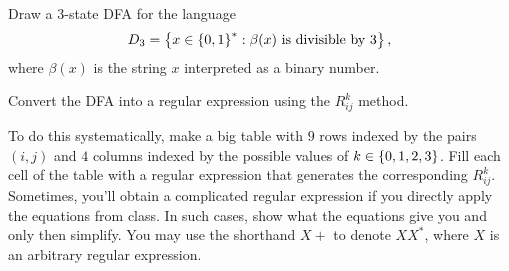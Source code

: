 \begin{problem}
  \begin{enumalph}
    \item Draw a $3$-state DFA for the language
    \[
      D_3 = \left\{ x \in \left\{0, 1\right\}^* :
      \beta(x) \text{ is divisible by } 3\right\},
    \]
    where $\beta(x)$ is the string $x$ interpreted as a
    binary number.
    \begin{Answer}
      
    \end{Answer}
    \item Convert the DFA into a regular expression
      using the $R_{ij}^k$ method.

      \step
      To do this systematically,
      make a big table with $9$ rows indexed by the pairs $(i, j)$
      and $4$ columns indexed by the possible values of $k \in \left\{0, 1, 2, 3\right\}$.
      Fill each cell of the table with a regular expression that generates
      the corresponding $R_{ij}^k$.
      Sometimes, you’ll obtain a complicated regular expression if you directly
      apply the equations from class. In such cases, show what the equations give you
      and only then simplify. You may use the shorthand $X+$ to denote $XX^\ast$,
      where $X$ is an arbitrary regular expression.
      \begin{Answer}  

      \end{Answer}
  \end{enumalph}
\end{problem}
